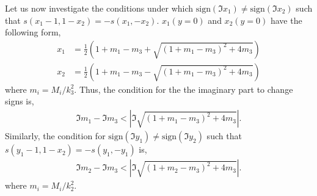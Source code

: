 \documentclass[twoside]{article}
\begin{document}
Let us now investigate the conditions under which $\textrm{sign}(\Im x_1) \neq \textrm{sign}(\Im x_2)$ such that $s(x_1 - 1 , 1 - x_2) =
-s(x_1, -x_2)$. $x_1(y = 0)$ and $x_2(y = 0)$ have the following form,
\begin{align}
  x_1 &=  \frac{1}{2}\left( 1 + m_1 - m_3 + \sqrt{(1 + m_1 - m_3)^2 + 4m_3} \right)\\
  x_2 &=  \frac{1}{2}\left( 1 + m_1 - m_3 - \sqrt{(1 + m_1 - m_3)^2 + 4m_3} \right)
\end{align}
where $m_i = M_i/k^2_3$. Thus, the condition for the the imaginary part to change signs is,
\begin{align}
  \Im m_1 - \Im m_3 < |\Im\sqrt{(1 + m_1 - m_3)^2 + 4m_3}|.
\end{align}
Similarly, the condition for $\textrm{sign}(\Im y_1) \neq \textrm{sign}(\Im y_2)$ such that $s(y_1 - 1, 1 - x_2) = -s(y_1, -y_1)$ is,
\begin{align}
  \Im m_2 - \Im m_3 < |\Im \sqrt{(1 + m_2 - m_3)^2 + 4m_3}|.
\end{align}
where $m_i = M_i/k^2_2$.
\end{document}

